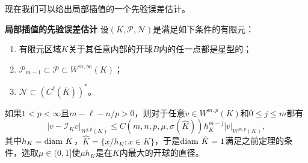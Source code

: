 \documentclass[a4paper,10pt]{ctexart}
\begin{document}
现在我们可以给出局部插值的一个先验误差估计。
\begin{theorem}{\normalfont\textbf{局部插值的先验误差估计}}\label{thm:local_interpolation}
    设$ (K,\mathcal{P},\mathcal{N}) $是满足如下条件的有限元：
    \begin{enumerate}
        \item 有限元区域$ K $关于其任意内部的开球$ B $内的任一点都是星型的；
        \item $ \mathcal{P}_{m-1}\subset \mathcal{P}\subset W^{m,\infty}(K) $；
        \item $ \mathcal{N}\subset (C^\ell(\overline{K}))^* $。
    \end{enumerate}
    如果$ 1<p<\infty $且$ m-\ell-n / p>0 $，则对于任意$ v\in W^{m,p}(K) $和$ 0\leqslant j\leqslant m $都有
    \begin{equation}
        |v-\mathcal{I}_Kv|_{W^{j,p}(K)} \leqslant C(m,n,p,\mu,\sigma(\hat{K}))h^{m-j}_K |v|_{W^{m,p}(K)},
    \end{equation}
    其中$ h_K = {\rm diam}\ K $，$ \hat{K} = \{x / h_K:x\in K\} $，于是$ {\rm diam}\ \hat{K}=1 $满足之前定理的条件，选取$ \mu\in (0,1] $使$ \mu h_K $是在$ K $内最大的开球的直径。
\end{theorem}
\end{document}
